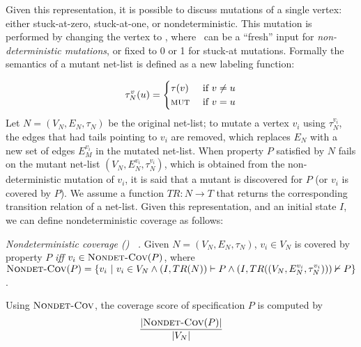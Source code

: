 Given this representation, it is possible to discuss mutations of a single vertex: either stuck-at-zero, stuck-at-one, or nondeterministic.  This mutation is performed by changing the vertex to \mutnode, where \mutnode\ can be a ``fresh'' input for \emph{non-deterministic mutations}, or fixed to 0 or 1 for stuck-at mutations. Formally the semantics of a mutant net-list is defined as a new labeling function:

\[ \tau^{v}_{N}(u) = \begin{cases}
    \tau(v) & \textrm{ if $v \neq u$} \\
    \textrm{{\sc mut}}   & \textrm{ if $v = u$}
\end{cases}  \]
\noindent
Let  $N = (V_N,E_N, \tau_N)$ be the original net-list; to mutate a vertex $v_i$ using $\tau^{v_i}_{N}$, the  edges that had tails pointing to $v_i$ are removed,
 which replaces $E_N$ with a new set of edges $E^{v_i}_M$ in the mutated net-list.
When property $P$ satisfied by $N$ fails on the mutant net-list $(V_N, E^{v_i}_N, \tau^{v_i}_{N})$, which is obtained from the non-deterministic mutation of $v_i$, it is said that a mutant is discovered for $P$ (or $v_i$ is covered by $P$).
We assume a function $TR : N \rightarrow T$ that returns the corresponding transition relation of a net-list. %
Given this representation, and an initial state $I$, we can define nondeterministic coverage as follows:

\begin{definition} {\emph{Nondeterministic coverage (\nondetcov) ~\cite{chockler2010coverage}.} }
\label{def:non-det}
Given $N = (V_N,E_N, \tau_N)$,
$v_i \in V_N$ is covered by property $P$ \emph{iff} $v_i \in \text{\sc Nondet-Cov} (P)$, where
$\text{\sc Nondet-Cov} (P) = \{ v_i~|~ v_i \in V_N \wedge (I, TR(N)) \vdash P \wedge (I, TR((V_N, E^{v_i}_N, \tau^{v_i}_{N}))) \nvdash P \}$.
\end{definition}
Using  $\text{\sc Nondet-Cov}$, the coverage score of specification $P$ is computed by
\[
   \frac{ | \text{\sc Nondet-Cov} (P) |}{|V_N|}
\]



